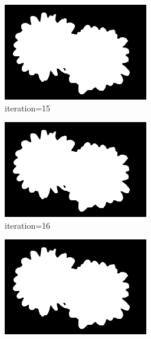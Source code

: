 \documentclass{article}
\begin{document}
\begin{figure}[t]
\begin{subfigure}[t]{0.19\textwidth}
\includegraphics[width=\textwidth]{./images/marginals_iter_15.png}
\vspace{-0.6cm}
\caption{iteration=15}
\end{subfigure}
\begin{subfigure}[t]{0.19\textwidth}
\centering
\includegraphics[width=\textwidth]{./images/marginals_iter_16.png}
\vspace{-0.6cm}
\caption{iteration=16}
\end{subfigure}
\begin{subfigure}[t]{0.19\textwidth}
\centering
\includegraphics[width=\textwidth]{./images/marginals_iter_17.png}

\end{subfigure}
\end{figure}
\end{document}
